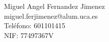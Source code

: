 Miguel Angel Fernandez Jimenez \\ %
miguel.ferjimenez@alum.uca.es \\ %
Teléfono: 601101415 \\ %
NIF: 77497367V \\ %
